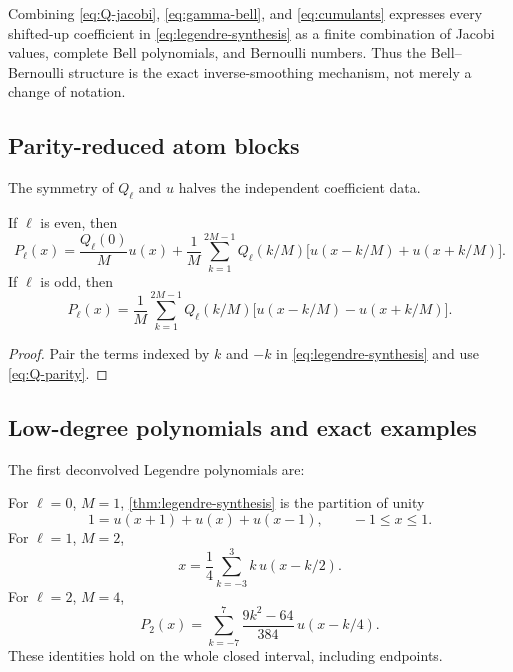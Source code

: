 \documentclass[11pt,oneside]{article}
\numberwithin{equation}{section}
\theoremstyle{definition}
\theoremstyle{remark}
\begin{document}
\begin{remark}
Combining \eqref{eq:Q-jacobi}, \eqref{eq:gamma-bell}, and
\eqref{eq:cumulants} expresses every shifted-up coefficient in
\eqref{eq:legendre-synthesis} as a finite combination of Jacobi values,
complete Bell polynomials, and Bernoulli numbers.  Thus the Bell--Bernoulli
structure is the exact inverse-smoothing mechanism, not merely a change of
notation.
\end{remark}

\subsection{Parity-reduced atom blocks}

The symmetry of $Q_\ell$ and $u$ halves the independent coefficient data.

\begin{corollary}
\label{cor:paired-synthesis}
If $\ell$ is even, then
\begin{equation}
 P_\ell(x)=\frac{Q_\ell(0)}M u(x)
 +\frac1M\sum_{k=1}^{2M-1}Q_\ell(k/M)
 \bigl[u(x-k/M)+u(x+k/M)\bigr].
 \label{eq:even-paired}
\end{equation}
If $\ell$ is odd, then
\begin{equation}
 P_\ell(x)=\frac1M\sum_{k=1}^{2M-1}Q_\ell(k/M)
 \bigl[u(x-k/M)-u(x+k/M)\bigr].
 \label{eq:odd-paired}
\end{equation}
\end{corollary}

\begin{proof}
Pair the terms indexed by $k$ and $-k$ in
\eqref{eq:legendre-synthesis} and use \eqref{eq:Q-parity}.
\end{proof}

\subsection{Low-degree polynomials and exact examples}

The first deconvolved Legendre polynomials are:


For $\ell=0$, $M=1$, \cref{thm:legendre-synthesis} is the partition of unity
\begin{equation}
 1=u(x+1)+u(x)+u(x-1),
 \qquad -1\le x\le1.
 \label{eq:P0-example}
\end{equation}
For $\ell=1$, $M=2$,
\begin{equation}
 x=\frac14\sum_{k=-3}^{3}k\,u(x-k/2).
 \label{eq:P1-example}
\end{equation}
For $\ell=2$, $M=4$,
\begin{equation}
 P_2(x)=\sum_{k=-7}^{7}\frac{9k^2-64}{384}\,u(x-k/4).
 \label{eq:P2-example}
\end{equation}
These identities hold on the whole closed interval, including endpoints.
\end{document}
